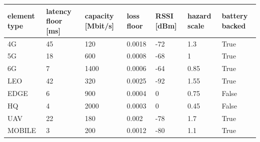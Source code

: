 \begin{tabular}{lllllll}
\toprule
element type & latency floor [ms] & capacity [Mbit/s] & loss floor & RSSI [dBm] & hazard scale & battery backed \\
\midrule
4G & 45 & 120 & 0.0018 & -72 & 1.3 & True \\
5G & 18 & 600 & 0.0008 & -68 & 1 & True \\
6G & 7 & 1400 & 0.0006 & -64 & 0.85 & True \\
LEO & 42 & 320 & 0.0025 & -92 & 1.55 & True \\
EDGE & 6 & 900 & 0.0004 & 0 & 0.75 & False \\
HQ & 4 & 2000 & 0.0003 & 0 & 0.45 & False \\
UAV & 22 & 180 & 0.002 & -78 & 1.7 & True \\
MOBILE & 3 & 200 & 0.0012 & -80 & 1.1 & True \\
\bottomrule
\end{tabular}
